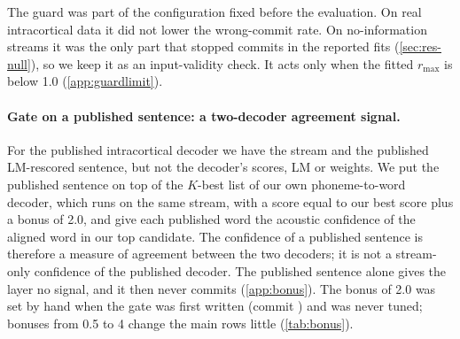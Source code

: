The guard was part of the configuration fixed before the evaluation. On real intracortical data it did not lower the wrong-commit rate. On no-information streams it was the only part that stopped commits in the reported fits (\cref{sec:res-null}), so we keep it as an input-validity check. It acts only when the fitted $r_{\max}$ is below 1.0 (\cref{app:guardlimit}).

\paragraph{Gate on a published sentence: a two-decoder agreement signal.} For the published intracortical decoder we have the stream and the published LM-rescored sentence, but not the decoder's scores, LM or weights. We put the published sentence on top of the $K$-best list of our own phoneme-to-word decoder, which runs on the same stream, with a score equal to our best score plus a bonus of 2.0, and give each published word the acoustic confidence of the aligned word in our top candidate. The confidence of a published sentence is therefore a measure of agreement between the two decoders; it is not a stream-only confidence of the published decoder. The published sentence alone gives the layer no signal, and it then never commits (\cref{app:bonus}). The bonus of 2.0 was set by hand when the gate was first written (commit ) and was never tuned; bonuses from 0.5 to 4 change the main rows little (\cref{tab:bonus}).

